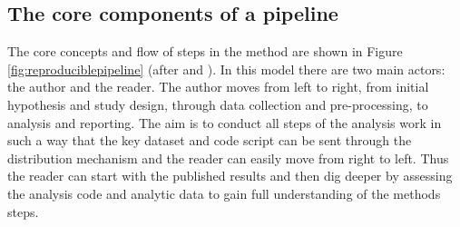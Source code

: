 \documentclass[11pt,a4paper]{article}
\begin{document}
\subsection{The core components of a pipeline}\label{the-core-components-of-a-pipeline}

The core concepts and flow of steps in the method are shown in Figure
\ref{fig:reproduciblepipeline} (after \citet{Peng2006} and
\citet{Solymos2008}).  In this model there are two main
actors: the author and the reader.  The author moves from left to
right, from initial hypothesis and study design, through data
collection and pre-processing, to analysis and reporting. The aim is
to conduct all steps of the analysis work in such a way that the key
dataset and code script can be sent through the distribution mechanism
and the reader can easily move from right to left. Thus the reader can
start with the published results and then dig deeper by assessing the
analysis code and analytic data to gain full understanding of the
methods steps.
\end{document}
